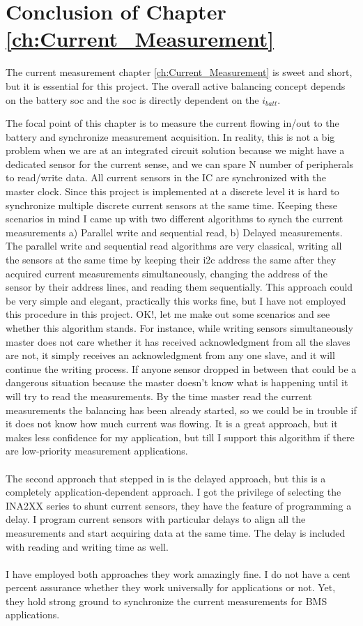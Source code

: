 \section*{Conclusion of Chapter \ref{ch:Current_Measurement}}
The current measurement chapter \ref{ch:Current_Measurement} is sweet and short, but it is essential for this project. The overall active balancing concept depends on the battery soc and the soc is directly dependent on the $i_{batt}$.

The focal point of this chapter is to measure the current flowing in/out to the battery and synchronize measurement acquisition. In reality, this is not a big problem when we are at an integrated circuit solution because we might have a dedicated sensor for the current sense, and we can spare N number of peripherals to read/write data. All current sensors in the IC are synchronized with the master clock. Since this project is implemented at a discrete level it is hard to synchronize multiple discrete current sensors at the same time.
Keeping these scenarios in mind I came up with two different algorithms to synch the current measurements a) Parallel write and sequential read, b) Delayed measurements. The parallel write and sequential read algorithms are very classical, writing all the sensors at the same time by keeping their i2c address the same after they acquired current measurements simultaneously, changing the address of the sensor by their address lines, and reading them sequentially.
This approach could be very simple and elegant, practically this works fine, but I have not employed this procedure in this project. OK!, let me make out some scenarios and see whether this algorithm stands. For instance, while writing sensors simultaneously master does not care whether it has received acknowledgment from all the slaves are not, it simply receives an acknowledgment from any one slave, and it will continue the writing process. If anyone sensor dropped in between that could be a dangerous situation because the master doesn't know what is happening until it will try to read the measurements. By the time master read the current measurements the balancing has been already started, so we could be in trouble if it does not know how much current was flowing. It is a great approach, but it makes less confidence for my application, but till I support this algorithm if there are low-priority measurement applications.
\\\\
The second approach that stepped in is the delayed approach, but this is a completely application-dependent approach. I got the privilege of selecting the INA2XX series to shunt current sensors, they have the feature of programming a delay. I program current sensors with particular delays to align all the measurements and start acquiring data at the same time. The delay is included with reading and writing time as well.
\\\\
I have employed both approaches they work amazingly fine. I do not have a cent percent assurance whether they work universally for applications or not. Yet, they hold strong ground to synchronize the current measurements for BMS applications.
